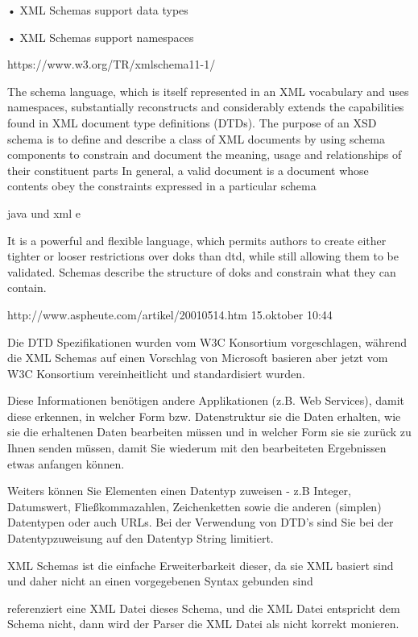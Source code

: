 • XML Schemas support data types

• XML Schemas support namespaces


https://www.w3.org/TR/xmlschema11-1/

The schema language, which is itself represented in an XML vocabulary and uses namespaces, substantially reconstructs and considerably extends the capabilities found in XML document type definitions (DTDs). The purpose of an XSD schema is to define and describe a class of XML documents by using schema components to constrain and document the meaning, usage and relationships of their constituent parts In general, a valid document is a document whose contents obey the constraints expressed in a particular schema


java und xml e

It is a powerful and flexible language, which permits authors to create either tighter or looser restrictions over doks than dtd, while still allowing them to be validated. Schemas describe the structure of doks and constrain what they can contain.


http://www.aspheute.com/artikel/20010514.htm 15.oktober 10:44

Die DTD Spezifikationen wurden vom W3C Konsortium vorgeschlagen, während die XML Schemas auf einen Vorschlag von Microsoft basieren aber jetzt vom W3C Konsortium vereinheitlicht und standardisiert wurden.

Diese Informationen benötigen andere Applikationen (z.B. Web Services), damit diese erkennen, in welcher Form bzw. Datenstruktur sie die Daten erhalten, wie sie die erhaltenen Daten bearbeiten müssen und in welcher Form sie sie zurück zu Ihnen senden müssen, damit Sie wiederum mit den bearbeiteten Ergebnissen etwas anfangen können.

Weiters können Sie Elementen einen Datentyp zuweisen - z.B Integer, Datumswert, Fließkommazahlen, Zeichenketten sowie die anderen (simplen) Datentypen oder auch URLs. Bei der Verwendung von DTD's sind Sie bei der Datentypzuweisung auf den Datentyp String limitiert.

XML Schemas ist die einfache Erweiterbarkeit dieser, da sie XML basiert sind und daher nicht an einen vorgegebenen Syntax gebunden sind

referenziert eine XML Datei dieses Schema, und die XML Datei entspricht dem Schema nicht, dann wird der Parser die XML Datei als nicht korrekt monieren.

